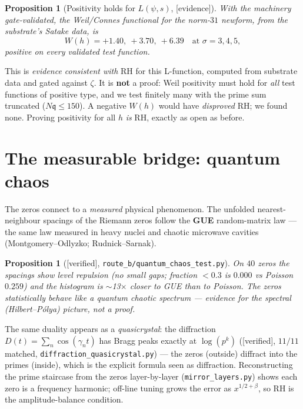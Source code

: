 \documentclass[11pt,a4paper]{article}
\newtheorem{proposition}[theorem]{Proposition}
\theoremstyle{definition}
\newcommand{\TAGver}{{\small\textsf{[\textcolor{blue!60!black}{verified}]}}}
\newcommand{\TAGev}{{\small\textsf{[\textcolor{orange!80!black}{evidence}]}}}
\begin{document}
\begin{proposition}[Positivity holds for $L(\psi,s)$, \TAGev]
With the machinery gate-validated, the Weil/Connes functional for the
norm-$31$ newform, from the substrate's Satake data, is
$$ W(h) = +1.40,\ +3.70,\ +6.39 \quad\text{at } \sigma = 3,4,5, $$
positive on every validated test function.
\end{proposition}

\begin{tcolorbox}[colback=orange!3,colframe=orange!70!black,arc=2mm,
  title={\textbf{What this is and is not}},fonttitle=\bfseries,breakable]
This is \emph{evidence consistent with} RH for this L-function, computed from
substrate data and gated against $\zeta$. It is \textbf{not} a proof: Weil
positivity must hold for \emph{all} test functions of positive type, and we
test finitely many with the prime sum truncated ($N\mathfrak{q}\le150$). A
negative $W(h)$ would have \emph{disproved} RH; we found none. Proving
positivity for all $h$ \emph{is} RH, exactly as open as before.
\end{tcolorbox}

\section{The measurable bridge: quantum chaos}\label{sec:chaos}

The zeros connect to a \emph{measured} physical phenomenon. The unfolded
nearest-neighbour spacings of the Riemann zeros follow the \textbf{GUE}
random-matrix law --- the same law measured in heavy nuclei and chaotic
microwave cavities (Montgomery--Odlyzko; Rudnick--Sarnak).

\begin{proposition}[\TAGver, \texttt{route\_b/quantum\_chaos\_test.py}]
On $40$ zeros the spacings show level repulsion (no small gaps; fraction
$<0.3$ is $0.000$ vs Poisson $0.259$) and the histogram is $\sim$13$\times$
closer to GUE than to Poisson. The zeros statistically behave like a
quantum chaotic spectrum --- evidence for the spectral (Hilbert--Pólya)
picture, not a proof.
\end{proposition}

The same duality appears as a \emph{quasicrystal}: the diffraction
$D(t)=\sum_n\cos(\gamma_n t)$ has Bragg peaks exactly at $\log(p^k)$
(\TAGver, $11/11$ matched, \texttt{diffraction\_quasicrystal.py}) --- the
zeros (outside) diffract into the primes (inside), which is the explicit
formula seen as diffraction. Reconstructing the prime staircase from the
zeros layer-by-layer (\texttt{mirror\_layers.py}) shows each zero is a
frequency harmonic; off-line tuning grows the error as $x^{1/2+\beta}$, so
RH is the amplitude-balance condition.
\end{document}
